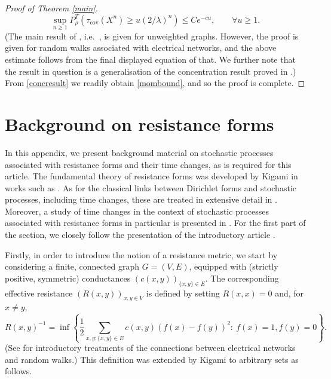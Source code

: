 \documentclass[a4paper, 11pt]{article}
\begin{document}
\begin{proof}[Proof of Theorem \ref{main}]
\begin{equation}\label{concresult}
\sup_{n\geq 1}P_{\rho}^T\left(\tau_{\mathrm{cov}}(X^n)\geq u(2/\lambda)^n\right)\leq Ce^{-cu},\qquad \forall u\geq 1.
\end{equation}
(The main result of \cite{Zhai}, i.e.\ \cite[Theorem 1.1]{Zhai}, is given for unweighted graphs. However, the proof is given for random walks associated with electrical networks, and the above estimate follows from the final displayed equation of that. We further note that the result in question is a generalisation of the concentration result proved in \cite{Ding}.) From \eqref{concresult} we readily obtain \eqref{mombound}, and so the proof is complete.
\end{proof}

\appendix

\section{Background on resistance forms}\label{appa}

In this appendix, we present background material on stochastic processes associated with resistance forms and their time changes, as is required for this article. The fundamental theory of resistance forms was developed by Kigami in works such as \cite{AOF,Kigres}. As for the classical links between Dirichlet forms and stochastic processes, including time changes, these are treated in extensive detail in \cite{FOT}. Moreover, a study of time changes in the context of stochastic processes associated with resistance forms in particular is presented in \cite{CHK}. For the first part of the section, we closely follow the presentation of the introductory article \cite{crintro}.

Firstly, in order to introduce the notion of a resistance metric, we start by considering a finite, connected graph $G=(V,E)$, equipped with (strictly positive, symmetric) conductances $(c(x,y))_{\{x,y\}\in E}$. The corresponding effective resistance $(R(x,y))_{x,y\in V}$ is defined by setting $R(x,x)=0$ and, for $x\neq y$,
\begin{equation}\label{resdef}
R(x,y)^{-1}=\inf\left\{\frac12\sum_{x,y:\{x,y\}\in E}c(x,y)\left(f(x)-f(y)\right)^2:\:f(x)=1,f(y)=0\right\}.
\end{equation}
(See \cite{Barbook,LPW} for introductory treatments of the connections between electrical networks and random walks.) This definition was extended by Kigami to arbitrary sets as follows.
\end{document}
